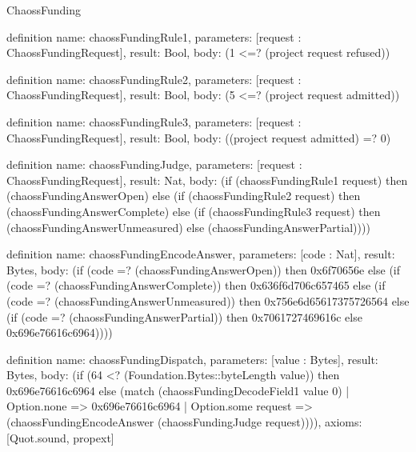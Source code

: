 \begin{lexlean}{ChaossFunding}
\begin{semanticmodule}
definition{
  name: chaossFundingRule1,
  parameters: [request : ChaossFundingRequest],
  result: Bool,
  body: (1 <=? (project request refused))
}

definition{
  name: chaossFundingRule2,
  parameters: [request : ChaossFundingRequest],
  result: Bool,
  body: (5 <=? (project request admitted))
}

definition{
  name: chaossFundingRule3,
  parameters: [request : ChaossFundingRequest],
  result: Bool,
  body: ((project request admitted) =? 0)
}

definition{
  name: chaossFundingJudge,
  parameters: [request : ChaossFundingRequest],
  result: Nat,
  body: (if (chaossFundingRule1 request) then (chaossFundingAnswerOpen) else (if (chaossFundingRule2 request) then (chaossFundingAnswerComplete) else (if (chaossFundingRule3 request) then (chaossFundingAnswerUnmeasured) else (chaossFundingAnswerPartial))))
}

definition{
  name: chaossFundingEncodeAnswer,
  parameters: [code : Nat],
  result: Bytes,
  body: (if (code =? (chaossFundingAnswerOpen)) then 0x6f70656e else (if (code =? (chaossFundingAnswerComplete)) then 0x636f6d706c657465 else (if (code =? (chaossFundingAnswerUnmeasured)) then 0x756e6d65617375726564 else (if (code =? (chaossFundingAnswerPartial)) then 0x7061727469616c else 0x696e76616c6964))))
}

definition{
  name: chaossFundingDispatch,
  parameters: [value : Bytes],
  result: Bytes,
  body: (if (64 <? (Foundation.Bytes::byteLength value)) then 0x696e76616c6964 else (match (chaossFundingDecodeField1 value 0)
    | Option.none => 0x696e76616c6964
    | Option.some request => (chaossFundingEncodeAnswer (chaossFundingJudge request)))),
  axioms: [Quot.sound, propext]
}
\end{semanticmodule}
\end{lexlean}
